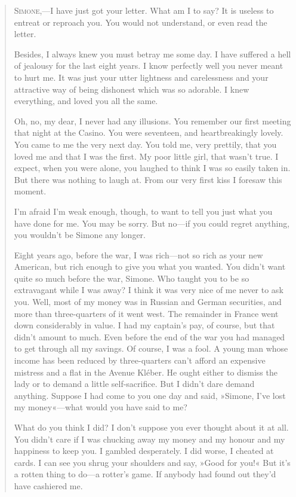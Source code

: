\begin{quotation}
\textsc{Simone},—I have just got your letter. What am I to say? It is
useless to entreat or reproach you. You would not understand, or even
read the letter.

Besides, I always knew you must betray me some day. I have suffered
a hell of jealousy for the last eight years. I know perfectly well
you never meant to hurt me. It was just your utter lightness and
carelessness and your attractive way of being dishonest which was so
adorable. I knew everything, and loved you all the same.

Oh, no, my dear, I never had any illusions. You remember our
first meeting that night at the Casino. You were seventeen, and
heartbreakingly lovely. You came to me the very next day. You told me,
very prettily, that you loved me and that I was the first. My poor
little girl, that wasn't true. I expect, when you were alone, you
laughed to think I was so easily taken in. But there was nothing to
laugh at. From our very first kiss I foresaw this moment.

I'm afraid I'm weak enough, though, to want to tell you just what
you have done for me. You may be sorry. But no—if you could regret
anything, you wouldn't be Simone any longer.

Eight years ago, before the war, I was rich—not so rich as your new
American, but rich enough to give you what you wanted. You didn't
want quite so much before the war, Simone. Who taught you to be so
extravagant while I was away? I think it was very nice of me never to
ask you. Well, most of my money was in Russian and German securities,
and more than three-quarters of it went west. The remainder in France
went down considerably in value. I had my captain's pay, of course,
but that didn't amount to much. Even before the end of the war you
had managed to get through all my savings. Of course, I was a fool. A
young man whose income has been reduced by three-quarters can't afford
an expensive mistress and a flat in the Avenue Kléber. He ought either
to dismiss the lady or to demand a little self-sacrifice. But I didn't
dare demand anything. Suppose I had come to you one day and said,
»Simone, I've lost my money«—what would you have said to me?

What do you think I did? I don't suppose you ever thought about it
at all. You didn't care if I was chucking away my money and my honour
and my happiness to keep you. I gambled desperately. I did worse, I
cheated at cards. I can see you shrug your shoulders and say, »Good
for you!« But it's a rotten thing to do—a rotter's game. If anybody
had found out they'd have cashiered me.


\end{quotation}
